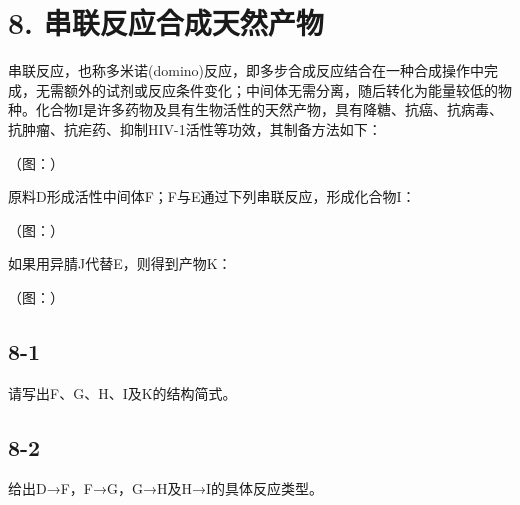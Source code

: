 \section*{8. 串联反应合成天然产物}
串联反应，也称多⽶诺(domino)反应，即多步合成反应结合在⼀种合成操作中完成，⽆需额外的试剂或反应条件变化；中间体⽆需分离，随后转化为能量较低的物种。化合物I是许多药物及具有⽣物活性的天然产物，具有降糖、抗癌、抗病毒、抗肿瘤、抗疟药、抑制HIV-1活性等功效，其制备⽅法如下：

（图：）

原料D形成活性中间体F；F与E通过下列串联反应，形成化合物I：

（图：）

如果⽤异腈J代替E，则得到产物K：

（图：）

\subsection*{8-1}
请写出F、G、H、I及K的结构简式。

\subsection*{8-2}
给出D→F，F→G，G→H及H→I的具体反应类型。
